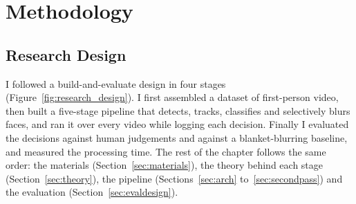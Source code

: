 \section{Methodology}
\label{sec:method}

\subsection{Research Design}
\label{sec:design}

I followed a build-and-evaluate design in four stages (Figure~\ref{fig:research_design}).
I first assembled a dataset of first-person video, then built a five-stage pipeline that
detects, tracks, classifies and selectively blurs faces, and ran it over every video while
logging each decision. Finally I evaluated the decisions against human judgements and
against a blanket-blurring baseline, and measured the processing time. The rest of the
chapter follows the same order: the materials (Section~\ref{sec:materials}), the theory
behind each stage (Section~\ref{sec:theory}), the pipeline
(Sections~\ref{sec:arch} to~\ref{sec:secondpass}) and the evaluation
(Section~\ref{sec:evaldesign}).

